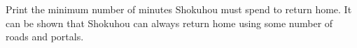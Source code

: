 Print the minimum number of minutes Shokuhou must spend to return home.
It can be shown that Shokuhou can always return home using some number of roads and portals.